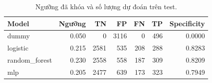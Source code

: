 \begin{table}[H]\centering\small
\caption{Ngưỡng đã khóa và số lượng dự đoán trên test.}
\begin{tabular}{@{}lrrrrrr@{}}\toprule
Model & Ngưỡng & TN & FP & FN & TP & Specificity \\\midrule
dummy & 0.050 & 0 & 3116 & 0 & 496 & 0.0000 \\
logistic & 0.215 & 2581 & 535 & 208 & 288 & 0.8283 \\
random\_forest & 0.230 & 2558 & 558 & 187 & 309 & 0.8209 \\
mlp & 0.205 & 2477 & 639 & 173 & 323 & 0.7949 \\
\bottomrule\end{tabular}
\end{table}